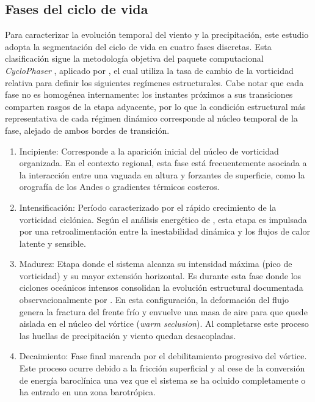 \subsection{Fases del ciclo de vida}\label{subsec:tb_fases}
Para caracterizar la evolución temporal del viento y la precipitación, este estudio adopta la segmentación del ciclo de vida en cuatro fases discretas. Esta clasificación sigue la metodología objetiva del paquete computacional \textit{CycloPhaser} \citep{deSouza2025CycloPhaser}, aplicado por \citet{coutodesouza2024new}, el cual utiliza la tasa de cambio de la vorticidad relativa para definir los siguientes regímenes estructurales. Cabe notar que cada fase no es homogénea internamente: los instantes próximos a sus transiciones comparten rasgos de la etapa adyacente, por lo que la condición estructural más representativa de cada régimen dinámico corresponde al núcleo temporal de la fase, alejado de ambos bordes de transición.

\begin{enumerate}
    \item Incipiente: Corresponde a la aparición inicial del núcleo de vorticidad organizada. En el contexto regional, esta fase está frecuentemente asociada a la interacción entre una vaguada en altura y forzantes de superficie, como la orografía de los Andes o gradientes térmicos costeros.    
    
    \item Intensificación: Período caracterizado por el rápido crecimiento de la vorticidad ciclónica. Según el análisis energético de \citet{coutodesouza2024thesis}, esta etapa es impulsada por una retroalimentación entre la inestabilidad dinámica y los flujos de calor latente y sensible.
    
    \item Madurez: Etapa donde el sistema alcanza su intensidad máxima (pico de vorticidad) y su mayor extensión horizontal. Es durante esta fase donde los ciclones oceánicos intensos consolidan la evolución estructural documentada observacionalmente por \citet{shapiro1999bridge}. En esta configuración, la deformación del flujo genera la fractura del frente frío y envuelve una masa de aire para que quede aislada en el núcleo del vórtice (\textit{warm seclusion}). Al completarse este proceso las huellas de precipitación y viento quedan desacopladas.
    
    \item Decaimiento: Fase final marcada por el debilitamiento progresivo del vórtice. Este proceso ocurre debido a la fricción superficial y al cese de la conversión de energía baroclínica una vez que el sistema se ha ocluido completamente o ha entrado en una zona barotrópica.
\end{enumerate}


